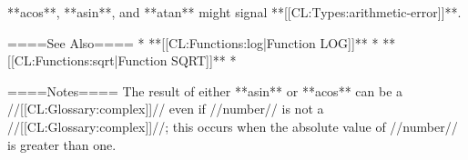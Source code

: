 **acos**, **asin**, and **atan** might signal **[[CL:Types:arithmetic-error]]**.

====See Also====
  * **[[CL:Functions:log|Function LOG]]**
  * **[[CL:Functions:sqrt|Function SQRT]]**
  * {\secref\FloatSubstitutability}

====Notes====
The result of either **asin** or **acos** can be a //[[CL:Glossary:complex]]// even if //number// is not a //[[CL:Glossary:complex]]//; this occurs when the absolute value of //number// is greater than one.

       
